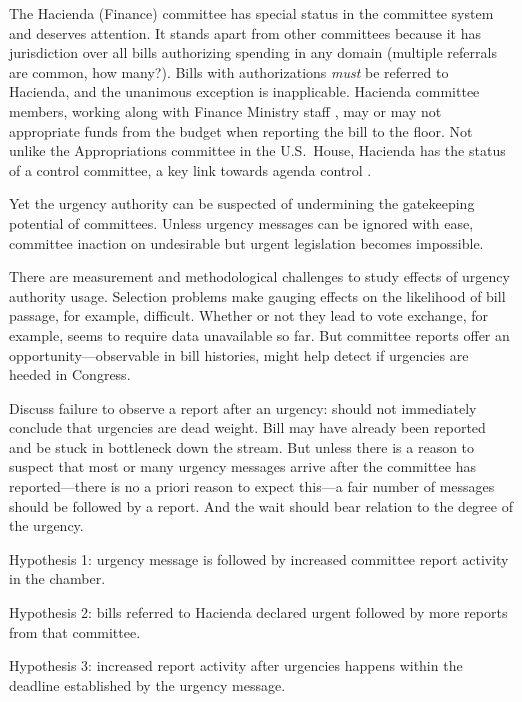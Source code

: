 \documentclass[letter,12pt]{article}
\begin{document}
The Hacienda (Finance) committee has special status in the committee system and deserves attention. It stands apart from other committees because it has jurisdiction over all bills authorizing spending in any domain (multiple referrals are common, how many?). Bills with authorizations \emph{must} be referred to Hacienda, and the unanimous exception is inapplicable. Hacienda committee members, working along with Finance Ministry staff \citep{aleman.navia.UrgChi.2009}, may or may not appropriate funds from the budget when reporting the bill to the floor. Not unlike the Appropriations committee in the U.S.\ House, Hacienda has the status of a control committee, a key link towards agenda control \citep{kiewiet.mccubbins.1991}. 

Yet the urgency authority can be suspected of undermining the gatekeeping potential of committees. Unless urgency messages can be ignored with ease, committee inaction on undesirable but urgent legislation becomes impossible. 

There are measurement and methodological challenges to study effects of urgency authority usage. Selection problems make gauging effects on the likelihood of bill passage, for example, difficult. Whether or not they lead to vote exchange, for example, seems to require data unavailable so far. But committee reports offer an opportunity---observable in bill histories, might help detect if urgencies are heeded in Congress. 

Discuss failure to observe a report after an urgency: should not immediately conclude that urgencies are dead weight. Bill may have already been reported and be stuck in bottleneck down the stream. But unless there is a reason to suspect that most or many  urgency messages arrive after the committee has reported---there is no a priori reason to expect this---a fair number of messages should be followed by a report. And the wait should bear relation to the degree of the urgency. 

Hypothesis 1: urgency message is followed by increased committee report activity in the chamber. 

Hypothesis 2: bills referred to Hacienda declared urgent followed by more reports from that committee.

Hypothesis 3: increased report activity after urgencies happens within the deadline established by the urgency message.
\end{document}
